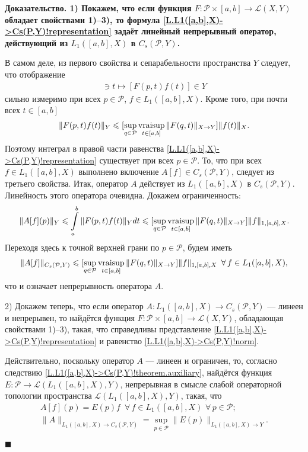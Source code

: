 \documentclass{report}
\newcounter{rem}[section]
\newcounter{theor}[section]
\newenvironment{Proof}{\par\noindent\bf Доказательство.\rm}{ $\blacksquare$\par}
\newcommand{\vraisup}{\mathop{\rm vraisup}}
\begin{document}
\begin{Proof}
1) Покажем, что если функция $F:\mathcal{P}\times[a,b]\to\mathcal{L}(X,Y)$ обладает свойствами 1)--3), то формула \eqref{L.L1([a,b],X)->Cs(P,Y)!representation} задаёт линейный непрерывный
оператор, действующий из $L_1([a,b],X)$ в $C_s(\mathcal{P},Y)$.

В самом деле, из первого свойства и сепарабельности пространства $Y$ следует, что отображение
\begin{gather*}
[a,b]\ni t\mapsto [F(p,t)f(t)]\in Y
\end{gather*}
сильно измеримо при всех $p\in \mathcal{P}$, $f\in L_1([a,b],X)$. Кроме того, при почти всех $t\in[a,b]$
\begin{gather*}
\|F(p,t)f(t)\|_Y\leqslant[\sup\limits_{q\in\mathcal{P}}\vraisup\limits_{t\in[a,b]}\|F(q,t)\|_{X\to Y}]\|f(t)\|_X.
\end{gather*}
Поэтому интеграл в правой части равенства \eqref{L.L1([a,b],X)->Cs(P,Y)!representation} существует при всех $p\in\mathcal{P}$. То, что при всех $f\in L_1([a,b],X)$ выполнено включение
$A[f]\in C_s(\mathcal{P},Y)$, следует из третьего свойства. Итак, оператор $A$ действует из $L_1([a,b],X)$ в $C_s(\mathcal{P},Y)$. Линейность этого оператора очевидна. Докажем
ограниченность:
\begin{gather*}
\|A[f](p)\|_Y\leqslant\int\limits_a^b\|F(p,t)f(t)\|_Ydt\leqslant[\sup\limits_{q\in\mathcal{P}}\vraisup\limits_{t\in[a,b]}\|F(q,t)\|_{X\to Y}]\|f\|_{1,[a,b],X}.
\end{gather*}
Переходя здесь к точной верхней грани по $p\in \mathcal{P}$, будем иметь
\begin{gather*}
\|A[f]\|_{C_s(\mathcal{P},Y)}\leqslant[\sup\limits_{q\in\mathcal{P}}\vraisup\limits_{t\in[a,b]}\|F(q,t)\|_{X\to Y}]\|f\|_{1,[a,b],X}\,\,\,\forall\,f\in L_1([a,b],X),
\end{gather*}
что и означает непрерывность оператора $A$.

2) Докажем теперь, что если оператор $A:L_1([a,b],X)\to C_s(\mathcal{P},Y)$ --- линеен и непрерывен, то найдётся функция $F:\mathcal{P}\times[a,b]\to\mathcal{L}(X,Y)$, обладающая
свойствами 1)--3), такая, что справедливы представление \eqref{L.L1([a,b],X)->Cs(P,Y)!representation} и равенство \eqref{L.L1([a,b],X)->Cs(P,Y)!norm}.

Действительно, поскольку оператор $A$ --- линеен и ограничен, то, согласно следствию \ref{L.L1([a,b],X)->Cs(P,Y)!theorem.auxiliary}, найдётся функция
$E:\mathcal{P}\to\mathcal{L}(L_1([a,b],X),Y)$, непрерывная в смысле слабой операторной топологии пространства $\mathcal{L}(L_1([a,b],X),Y)$, такая, что
\begin{gather}
\label{L.L1([a,b],X)->Cs(P,Y)!representation2}
A[f](p)=E(p)f\,\,\,\forall\,f\in L_1([a,b],X)\,\,\forall\,p\in \mathcal{P};\\
\label{L.L1([a,b],X)->Cs(P,Y)!norm2}
\|A\|_{L_1([a,b],X)\to C_s(\mathcal{P},Y)}=\sup\limits_{p\in\mathcal{P}}\|E(p)\|_{L_1([a,b],X)\to Y}.
\end{gather}


\end{Proof}
\end{document}
